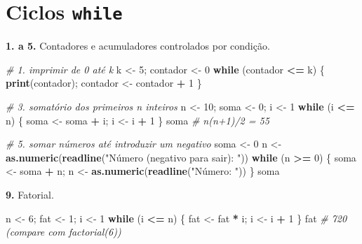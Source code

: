 \documentclass[
  portuguese,
  11pt,
  openany]{book}
\newenvironment{Shaded}{\begin{snugshade}}{\end{snugshade}}
\newcommand{\CommentTok}[1]{\textcolor[rgb]{0.56,0.35,0.01}{\textit{#1}}}
\newcommand{\ControlFlowTok}[1]{\textcolor[rgb]{0.13,0.29,0.53}{\textbf{#1}}}
\newcommand{\DecValTok}[1]{\textcolor[rgb]{0.00,0.00,0.81}{#1}}
\newcommand{\FunctionTok}[1]{\textcolor[rgb]{0.13,0.29,0.53}{\textbf{#1}}}
\newcommand{\NormalTok}[1]{#1}
\newcommand{\OtherTok}[1]{\textcolor[rgb]{0.56,0.35,0.01}{#1}}
\newcommand{\SpecialCharTok}[1]{\textcolor[rgb]{0.81,0.36,0.00}{\textbf{#1}}}
\newcommand{\StringTok}[1]{\textcolor[rgb]{0.31,0.60,0.02}{#1}}
\begin{document}
\section{\texorpdfstring{Ciclos \texttt{while}}{Ciclos while}}\label{ciclos-while}

\textbf{1. a 5.} Contadores e acumuladores controlados por condição.

\begin{Shaded}
\begin{Highlighting}[]
\CommentTok{\# 1. imprimir de 0 até k}
\NormalTok{k }\OtherTok{\textless{}{-}} \DecValTok{5}\NormalTok{; contador }\OtherTok{\textless{}{-}} \DecValTok{0}
\ControlFlowTok{while}\NormalTok{ (contador }\SpecialCharTok{\textless{}=}\NormalTok{ k) \{ }\FunctionTok{print}\NormalTok{(contador); contador }\OtherTok{\textless{}{-}}\NormalTok{ contador }\SpecialCharTok{+} \DecValTok{1}\NormalTok{ \}}

\CommentTok{\# 3. somatório dos primeiros n inteiros}
\NormalTok{n }\OtherTok{\textless{}{-}} \DecValTok{10}\NormalTok{; soma }\OtherTok{\textless{}{-}} \DecValTok{0}\NormalTok{; i }\OtherTok{\textless{}{-}} \DecValTok{1}
\ControlFlowTok{while}\NormalTok{ (i }\SpecialCharTok{\textless{}=}\NormalTok{ n) \{ soma }\OtherTok{\textless{}{-}}\NormalTok{ soma }\SpecialCharTok{+}\NormalTok{ i; i }\OtherTok{\textless{}{-}}\NormalTok{ i }\SpecialCharTok{+} \DecValTok{1}\NormalTok{ \}}
\NormalTok{soma                       }\CommentTok{\# n(n+1)/2 = 55}

\CommentTok{\# 5. somar números até introduzir um negativo}
\NormalTok{soma }\OtherTok{\textless{}{-}} \DecValTok{0}
\NormalTok{n }\OtherTok{\textless{}{-}} \FunctionTok{as.numeric}\NormalTok{(}\FunctionTok{readline}\NormalTok{(}\StringTok{"Número (negativo para sair): "}\NormalTok{))}
\ControlFlowTok{while}\NormalTok{ (n }\SpecialCharTok{\textgreater{}=} \DecValTok{0}\NormalTok{) \{ soma }\OtherTok{\textless{}{-}}\NormalTok{ soma }\SpecialCharTok{+}\NormalTok{ n; n }\OtherTok{\textless{}{-}} \FunctionTok{as.numeric}\NormalTok{(}\FunctionTok{readline}\NormalTok{(}\StringTok{"Número: "}\NormalTok{)) \}}
\NormalTok{soma}
\end{Highlighting}
\end{Shaded}

\textbf{9.} Fatorial.

\begin{Shaded}
\begin{Highlighting}[]
\NormalTok{n }\OtherTok{\textless{}{-}} \DecValTok{6}\NormalTok{; fat }\OtherTok{\textless{}{-}} \DecValTok{1}\NormalTok{; i }\OtherTok{\textless{}{-}} \DecValTok{1}
\ControlFlowTok{while}\NormalTok{ (i }\SpecialCharTok{\textless{}=}\NormalTok{ n) \{ fat }\OtherTok{\textless{}{-}}\NormalTok{ fat }\SpecialCharTok{*}\NormalTok{ i; i }\OtherTok{\textless{}{-}}\NormalTok{ i }\SpecialCharTok{+} \DecValTok{1}\NormalTok{ \}}
\NormalTok{fat                        }\CommentTok{\# 720  (compare com factorial(6))}
\end{Highlighting}
\end{Shaded}
\end{document}
